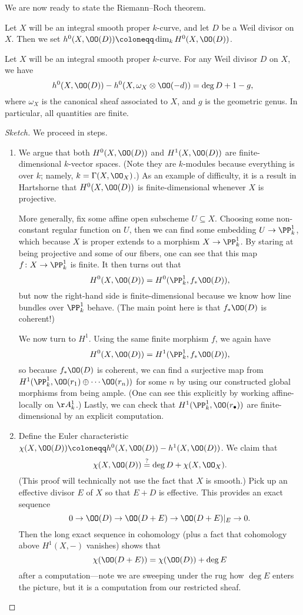 \documentclass[../notes.tex]{subfiles}
\begin{document}
We are now ready to state the Riemann--Roch theorem.
\begin{notation}
	Let $X$ will be an integral smooth proper $k$-curve, and let $D$ be a Weil divisor on $X$. Then we set $h^0(X,\OO(D))\coloneqq\dim_kH^0(X,\OO(D))$.
\end{notation}
\begin{theorem}
	Let $X$ will be an integral smooth proper $k$-curve. For any Weil divisor $D$ on $X$, we have
	\[h^0(X,\OO(D))-h^0(X,\omega_X\otimes\OO(-d))=\deg D+1-g,\]
	where $\omega_X$ is the canonical sheaf associated to $X$, and $g$ is the geometric genus. In particular, all quantities are finite.
\end{theorem}
\begin{proof}[Sketch]
	We proceed in steps.
	\begin{enumerate}
		\item We argue that both $H^0(X,\OO(D))$ and $H^1(X,\OO(D))$ are finite-dimensional $k$-vector spaces. (Note they are $k$-modules because everything is over $k$; namely, $k=\Gamma(X,\OO_X)$.) As an example of difficulty, it is a result in Hartshorne \cite[Theorem~5.19]{hartshorne} that $H^0(X,\OO(D))$ is finite-dimensional whenever $X$ is projective.

		More generally, fix some affine open subscheme $U\subseteq X$. Choosing some non-constant regular function on $U$, then we can find some embedding $U\to\PP^1_k$, which because $X$ is proper extends to a morphism $X\to\PP^1_k$. By staring at being projective and some of our fibers, one can see that this map $f\colon X\to\PP^1_k$ is finite. It then turns out that
		\[H^0(X,\OO(D))=H^0(\PP^1_k,f_*\OO(D)),\]
		but now the right-hand side is finite-dimensional because we know how line bundles over $\PP^1_k$ behave. (The main point here is that $f_*\OO(D)$ is coherent!)

		We now turn to $H^1$. Using the same finite morphism $f$, we again have
		\[H^0(X,\OO(D))=H^1(\PP^1_k,f_*\OO(D)),\]
		so because $f_*\OO(D)$ is coherent, we can find a surjective map from $H^1(\PP^1_k,\OO(r_1)\oplus\cdots\OO(r_n))$ for some $n$ by using our constructed global morphisms from being ample. (One can see this explicitly by working affine-locally on $\AA^1_k$.) Lastly, we can check that $H^1(\PP^1_k,\OO(r_\bullet))$ are finite-dimensional by an explicit computation.

		\item Define the Euler characteristic $\chi(X,\OO(D))\coloneqq h^0(X,\OO(D))-h^1(X,\OO(D))$. We claim that
		\[\chi(X,\OO(D))\stackrel?=\deg D+\chi(X,\OO_X).\]
		(This proof will technically not use the fact that $X$ is smooth.) Pick up an effective divisor $E$ of $X$ so that $E+D$ is effective. This provides an exact sequence
		\[0\to\OO(D)\to\OO(D+E)\to\OO(D+E)|_E\to0.\]
		Then the long exact sequence in cohomology (plus a fact that cohomology above $H^1(X,-)$ vanishes) shows that
		\[\chi(\OO(D+E))=\chi(\OO(D))+\deg E\]
		after a computation---note we are sweeping under the rug how $\deg E$ enters the picture, but it is a computation from our restricted sheaf.


\end{enumerate}
\end{proof}
\end{document}
